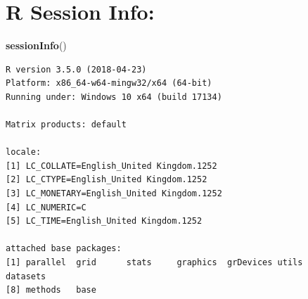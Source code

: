 \documentclass[11pt,oneside,a4paper]{reedthesis}
\newenvironment{Shaded}{\begin{snugshade}}{\end{snugshade}}
\newcommand{\KeywordTok}[1]{\textcolor[rgb]{0.13,0.29,0.53}{\textbf{#1}}}
\newcommand{\NormalTok}[1]{#1}
\begin{document}
\section{R Session Info:}\label{r-session-info}
\begin{Shaded}
\begin{Highlighting}[]
\KeywordTok{sessionInfo}\NormalTok{()}
\end{Highlighting}
\end{Shaded}
\begin{verbatim}
R version 3.5.0 (2018-04-23)
Platform: x86_64-w64-mingw32/x64 (64-bit)
Running under: Windows 10 x64 (build 17134)

Matrix products: default

locale:
[1] LC_COLLATE=English_United Kingdom.1252 
[2] LC_CTYPE=English_United Kingdom.1252   
[3] LC_MONETARY=English_United Kingdom.1252
[4] LC_NUMERIC=C                           
[5] LC_TIME=English_United Kingdom.1252    

attached base packages:
[1] parallel  grid      stats     graphics  grDevices utils     datasets 
[8] methods   base     


\end{verbatim}
\end{document}
